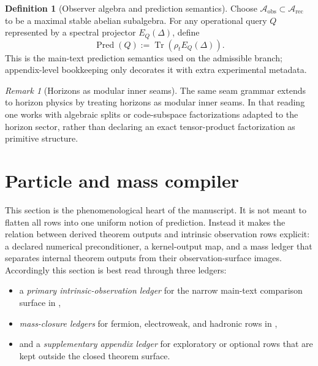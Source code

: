 \documentclass[11pt,a4paper]{article}
\theoremstyle{definition}
\newtheorem{definition}[theorem]{Definition}
\theoremstyle{remark}
\newtheorem*{remark}{Remark}
\DeclareMathOperator{\tr}{Tr}
\newcommand{\Arec}{\mathcal A_{\mathrm{rec}}}
\newcommand{\Aobs}{\mathcal A_{\mathrm{obs}}}
\newcommand{\Pred}{\operatorname{Pred}}
\begin{document}
\begin{definition}[Observer algebra and prediction semantics]
\label{def:observer-algebra-prediction}
Choose $\Aobs\subset\Arec$ to be a maximal stable abelian subalgebra. For any operational query $Q$ represented by a spectral projector $E_Q(\Delta)$, define
\[
\Pred(Q):=\tr(\rho_tE_Q(\Delta)).
\]
This is the main-text prediction semantics used on the admissible branch; appendix-level bookkeeping only decorates it with extra experimental metadata.
\end{definition}

\begin{remark}[Horizons as modular inner seams]
The same seam grammar extends to horizon physics by treating horizons as modular inner seams. In that reading one works with algebraic splits or code-subspace factorizations adapted to the horizon sector, rather than declaring an exact tensor-product factorization as primitive structure.
\end{remark}

\section{Particle and mass compiler}

This section is the phenomenological heart of the manuscript. It is not meant to flatten all
rows into one uniform notion of prediction. Instead it makes the relation between derived theorem
outputs and intrinsic observation rows explicit: a declared numerical preconditioner, a
kernel-output map, and a mass ledger that separates internal theorem outputs from their
observation-surface images.
Accordingly this section is best read through three ledgers:
\begin{itemize}[leftmargin=1.5em, topsep=3pt, itemsep=2pt]
    \item a \emph{primary intrinsic-observation ledger} for the narrow main-text comparison surface in ,
    \item \emph{mass-closure ledgers} for fermion, electroweak, and hadronic rows in ,
    \item and a \emph{supplementary appendix ledger} for exploratory or optional rows that are kept outside the closed theorem surface.
\end{itemize}
\end{document}

